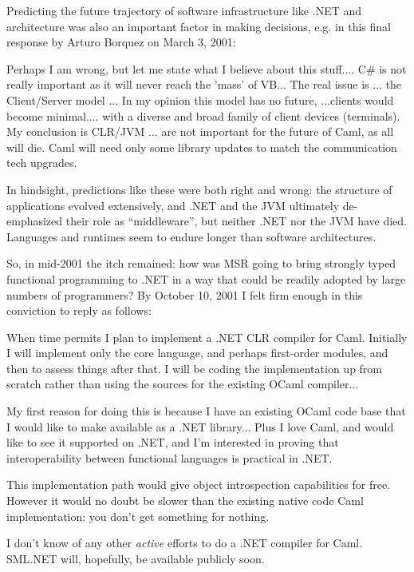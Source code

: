 \documentclass[acmsmall,review]{acmart}\settopmatter{printfolios=true,printccs=false,printacmref=false}
\begin{document}
Predicting the future trajectory of software infrastructure like .NET and architecture was also an important factor in making decisions, e.g. in this final response by Arturo Borquez on March 3, 2001:
\begin{verbquote}
Perhaps I am wrong, but let me state what I believe about this stuff.... C\# is not really important as it will never reach the 'mass' of VB... The real issue is ... the Client/Server model ... In my opinion this model has no future, ...clients would become minimal.... with a diverse and broad family of client devices (terminals). My conclusion is CLR/JVM ... are not important for the future of Caml, as all will die. Caml will need only some library updates to match the communication tech upgrades.  
\end{verbquote}
In hindsight, predictions like these were both right and wrong: the structure of applications evolved extensively, and .NET and the JVM ultimately de-emphasized their role as “middleware”, but neither .NET nor the JVM have died.  Languages and runtimes seem to endure longer than software architectures.

So, in mid-2001 the itch remained: how was MSR going to bring strongly typed functional programming to .NET in a way that could be readily adopted by large numbers of programmers?  By October 10, 2001 I felt firm enough in this conviction to reply as follows:

\begin{verbquote}
When time permits I plan to implement a .NET CLR compiler for Caml. Initially I will implement only the core language, and perhaps first-order modules, and then to assess things after that.  I will be coding the implementation up from scratch rather than using the sources for the existing OCaml compiler...

My first reason for doing this is because I have an existing OCaml code base that I would like to make available as a .NET library...  Plus I love Caml, and would like to see it supported on .NET, and I'm interested in proving that interoperability between functional languages is practical in .NET. 

This implementation path would give object introspection capabilities for free.  However it would no doubt be slower than the existing native code Caml implementation: you don't get something for nothing.

I don't know of any other \emph{active} efforts to do a .NET compiler for Caml.  SML.NET will, hopefully, be available publicly soon.
\end{verbquote}
\end{document}
